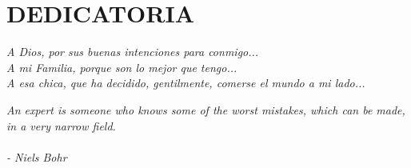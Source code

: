 \chapter*{DEDICATORIA}

{\it A Dios, por sus buenas intenciones para conmigo...} \\[2mm]
{\it A mi Familia, porque son lo mejor que tengo...} \\[2mm]
{\it A esa chica, que ha decidido, gentilmente, comerse el mundo a mi lado...} \\[10mm]

\vfill

\noindent\hfill 
\begin{minipage}{0.4\textwidth}
{\it An expert is someone who knows some of the worst mistakes, which can be made, in a very narrow field.} \\ \\
{\it - Niels Bohr}
\end{minipage} 